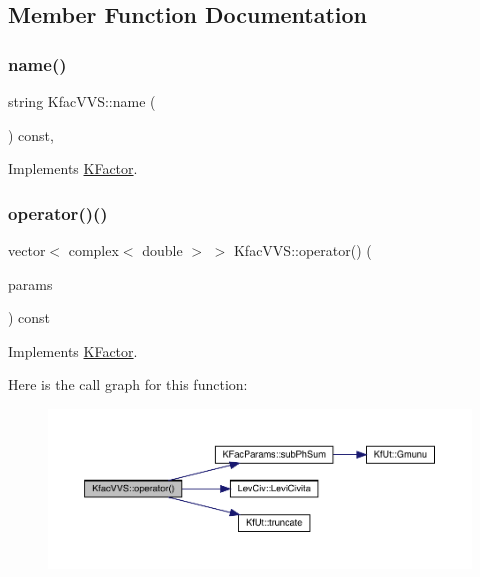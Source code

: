 \subsection{Member Function Documentation}
\mbox{\label{classKfacVVS_a2bd46e36671569204826348d5ec6d64a}} 
\subsubsection{\texorpdfstring{name()}{name()}}
{\footnotesize\ttfamily string Kfac\+V\+V\+S\+::name (\begin{DoxyParamCaption}{ }\end{DoxyParamCaption}) const\hspace{0.3cm}{\ttfamily [inline]}, {\ttfamily [virtual]}}



Implements \mbox{\hyperlink{classKFactor_ae578f8d6e4b525895427717da99cab6c}{K\+Factor}}.

\mbox{\label{classKfacVVS_ae892df7c0a0595020b968fd9c87be256}} 
\subsubsection{\texorpdfstring{operator()()}{operator()()}}
{\footnotesize\ttfamily vector$<$ complex$<$ double $>$ $>$ Kfac\+V\+V\+S\+::operator() (\begin{DoxyParamCaption}\item[{const \mbox{\hyperlink{classKFacParams}{K\+Fac\+Params}} \&}]{params }\end{DoxyParamCaption}) const\hspace{0.3cm}{\ttfamily [virtual]}}



Implements \mbox{\hyperlink{classKFactor_a012aae9ff4a07eab86d5d50b7f774285}{K\+Factor}}.

Here is the call graph for this function\+:
\nopagebreak
\begin{figure}[H]
\begin{center}
\leavevmode
\includegraphics[width=350pt]{dd/d85/classKfacVVS_ae892df7c0a0595020b968fd9c87be256_cgraph}
\end{center}
\end{figure}


